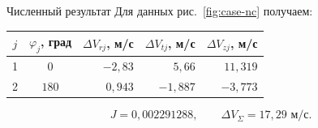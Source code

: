 \begin{explanation}{Численный результат}
Для данных рис.~\ref{fig:case-nc} получаем:
\begin{center}\begin{tabular}{cc|rrr}
$j$ & $\varphi_j$, град & $\Delta V_{rj}$, м/с & $\Delta V_{tj}$, м/с & $\Delta V_{zj}$, м/с\\\hline
1 & $0$ & $-2{,}83$ & $5{,}66$ & $11{,}319$\\
2 & $180$ & $0{,}943$ & $-1{,}887$ & $-3{,}773$\\
\end{tabular}\end{center}
\[ J=0{,}002291288,\qquad \Delta V_\Sigma=17{,}29\text{ м/с}.\]
\end{explanation}
